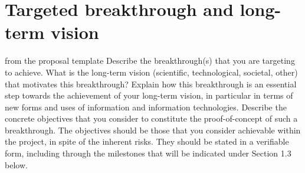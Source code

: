 \section{Targeted breakthrough and long-term vision}\label{sec:objectives}
\begin{todo}{from the proposal template}
  Describe the breakthrough(s) that you are targeting to achieve. What is the long-term
  vision (scientific, technological, societal, other) that motivates this breakthrough?
  Explain how this breakthrough is an essential step towards the achievement of your
  long-term vision, in particular in terms of new forms and uses of information and
  information technologies. Describe the concrete objectives that you consider to
  constitute the proof-of-concept of such a breakthrough. The objectives should be those
  that you consider achievable within the project, in spite of the inherent risks. They
  should be stated in a verifiable form, including through the milestones that will be
  indicated under Section 1.3 below.
\end{todo}

